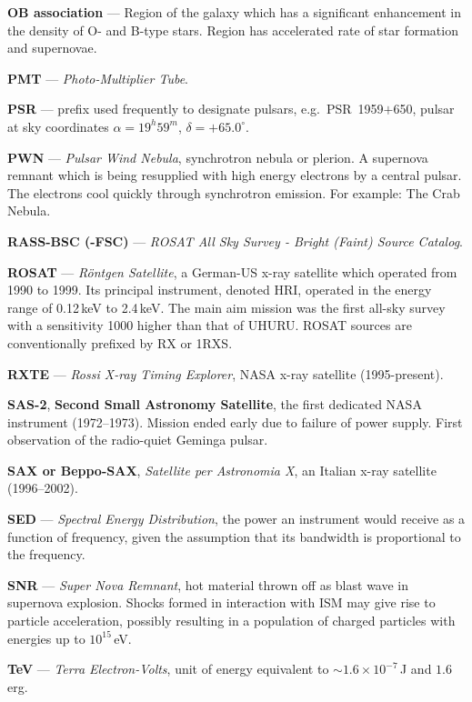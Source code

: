 \textbf{OB association} --- Region of the galaxy which has a significant
enhancement in the density of O- and B-type stars. Region has
accelerated rate of star formation and supernovae.

\textbf{PMT} --- \textit{Photo-Multiplier Tube}.

\textbf{PSR} --- prefix used frequently to designate pulsars, e.g.\ 
PSR~1959$+$650, pulsar at sky coordinates $\alpha=19^h59^m$,
$\delta=+65.0^\circ$.

\textbf{PWN} --- \textit{Pulsar Wind Nebula}, synchrotron nebula or
plerion. A supernova remnant which is being resupplied with high
energy electrons by a central pulsar. The electrons cool quickly
through synchrotron emission. For example: The Crab Nebula.

\textbf{RASS-BSC (-FSC)} --- \textit{ROSAT All Sky Survey - Bright 
(Faint) Source Catalog}.

\textbf{ROSAT} --- \textit{R\"ontgen Satellite}, a German-US x-ray
satellite which operated from 1990 to 1999. Its principal instrument,
denoted HRI, operated in the energy range of 0.12\,keV to
2.4\,keV. The main aim mission was the first all-sky survey with a
sensitivity 1000 higher than that of UHURU. ROSAT sources are
conventionally prefixed by RX or 1RXS.

\textbf{RXTE} --- \textit{Rossi X-ray Timing Explorer}, NASA x-ray 
satellite (1995-present).

\textbf{SAS-2}, \textbf{Second Small Astronomy Satellite}, the first
dedicated NASA \Gray instrument (1972--1973). Mission ended early due
to failure of power supply. First observation of the radio-quiet
Geminga pulsar.

\textbf{SAX or Beppo-SAX}, \textit{Satellite per Astronomia X}, an Italian 
x-ray satellite (1996--2002).

\textbf{SED} --- \textit{Spectral Energy Distribution}, the power an 
instrument would receive as a function of frequency, given the
assumption that its bandwidth is proportional to the frequency.

\textbf{SNR} --- \textit{Super Nova Remnant}, hot material thrown off
as blast wave in supernova explosion. Shocks formed in interaction
with ISM may give rise to particle acceleration, possibly resulting in
a population of charged particles with energies up to $10^{15}$\,eV.

\textbf{TeV} --- \textit{Terra Electron-Volts}, unit of energy equivalent
to $\sim1.6\times10^{-7}$\,J and $1.6$\,erg.

